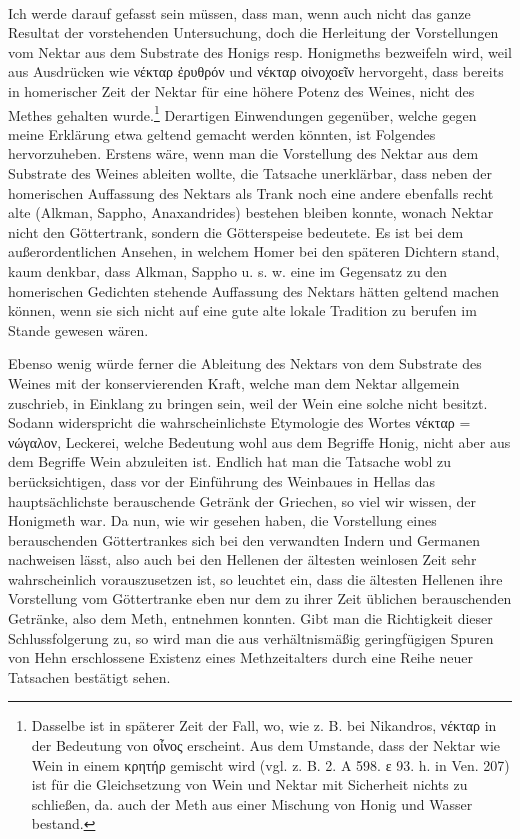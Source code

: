 \documentclass[a4paper, 11pt, oneside]{article}
\begin{document}
\paragraph{}
Ich werde darauf gefasst sein müssen, dass man, wenn auch nicht das ganze Resultat der vorstehenden Untersuchung, doch die Herleitung der Vorstellungen vom Nektar aus dem Substrate des Honigs resp. Honigmeths bezweifeln wird, weil aus Ausdrücken wie νέκταρ ἐρυθρόν und νέκταρ οἰνοχοεῖν hervorgeht, dass bereits in homerischer Zeit der Nektar für eine höhere Potenz des Weines, nicht des Methes gehalten wurde.\footnote{Dasselbe ist in späterer Zeit der Fall, wo, wie z. B. bei Nikandros, νέκταρ in der Bedeutung von οἶνος erscheint. Aus dem Umstande, dass der Nektar wie Wein in einem κρητήρ gemischt wird (vgl. z. B. 2. A 598. ε 93. h. in Ven. 207) ist für die Gleichsetzung von Wein und Nektar mit Sicherheit nichts zu schließen, da. auch der Meth aus einer Mischung von Honig und Wasser bestand.} Derartigen Einwendungen gegenüber, welche gegen meine Erklärung etwa geltend gemacht werden könnten, ist Folgendes hervorzuheben. Erstens wäre, wenn man die Vorstellung des Nektar aus dem Substrate des Weines ableiten wollte, die Tatsache unerklärbar, dass neben der homerischen Auffassung des Nektars als Trank noch eine andere ebenfalls recht alte (Alkman, Sappho, Anaxandrides) bestehen bleiben konnte, wonach Nektar nicht den Göttertrank, sondern die Götterspeise bedeutete. Es ist bei dem außerordentlichen Ansehen, in welchem Homer bei den späteren Dichtern stand, kaum denkbar, dass Alkman, Sappho u. s. w. eine im Gegensatz zu den homerischen Gedichten stehende Auffassung des Nektars hätten geltend machen können, wenn sie sich nicht auf eine gute alte lokale Tradition zu berufen im Stande gewesen wären.

Ebenso wenig würde ferner die Ableitung des Nektars von dem Substrate des Weines mit der konservierenden Kraft, welche man dem Nektar allgemein zuschrieb, in Einklang zu bringen sein, weil der Wein eine solche nicht besitzt. Sodann widerspricht die wahrscheinlichste Etymologie des Wortes νέκταρ = νώγαλον, Leckerei, welche Bedeutung wohl aus dem Begriffe Honig, nicht aber aus dem Begriffe Wein abzuleiten ist. Endlich hat man die Tatsache wobl zu berücksichtigen, dass vor der Einführung des Weinbaues in Hellas das hauptsächlichste berauschende Getränk der Griechen, so viel wir wissen, der Honigmeth war. Da nun, wie wir gesehen haben, die Vorstellung eines berauschenden Göttertrankes sich bei den verwandten Indern und Germanen nachweisen lässt, also auch bei den Hellenen der ältesten weinlosen Zeit sehr wahrscheinlich vorauszusetzen ist, so leuchtet ein, dass die ältesten Hellenen ihre Vorstellung vom Göttertranke eben nur dem zu ihrer Zeit üblichen berauschenden Getränke, also dem Meth, entnehmen konnten. Gibt man die Richtigkeit dieser Schlussfolgerung zu, so wird man die aus verhältnismäßig geringfügigen Spuren von Hehn erschlossene Existenz eines Methzeitalters durch eine Reihe neuer Tatsachen bestätigt sehen.
\clearpage
\end{document}
